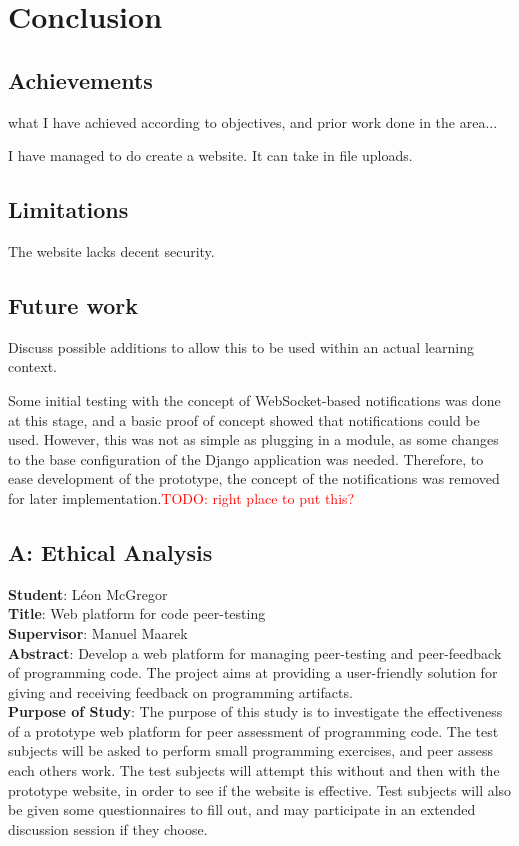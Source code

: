 \documentclass[a4paper,11pt]{report}
\newcommand{\todo}[1]{\textcolor{red}{TODO: #1}}
\begin{document}
\chapter{Conclusion}
\section{Achievements}
what I have achieved according to objectives, and prior work done in the area...\par
I have managed to do create a website. It can take in file uploads.
\section{Limitations}
The website lacks decent security.
\section{Future work}
Discuss possible additions to allow this to be used within an actual learning context.\par
Some initial testing with the concept of WebSocket-based notifications was done at this stage, and a basic proof of concept showed that notifications could be used. However, this was not as simple as plugging in a module, as some changes to the base configuration of the Django application was needed. Therefore, to ease development of the prototype, the concept of the notifications was removed for later implementation.\todo{right place to put this?}\par

\pagebreak
\singlespacing
\printbibliography
{}

\section*{A: Ethical Analysis}
\label{app:ethical}
\textbf{Student}: L\'eon McGregor\\
\textbf{Title}: Web platform for code peer-testing\\
\textbf{Supervisor}: Manuel Maarek\\
\textbf{Abstract}: Develop a web platform for managing peer-testing and peer-feedback of programming code. The project aims at providing a user-friendly solution for giving and receiving feedback on programming artifacts.\\
\textbf{Purpose of Study}: The purpose of this study is to investigate the effectiveness of a prototype web platform for peer assessment of programming code. The test subjects will be asked to perform small programming exercises, and peer assess each others work. The test subjects will attempt this without and then with the prototype website, in order to see if the website is effective. Test subjects will also be given some questionnaires to fill out, and may participate in an extended discussion session if they choose.
\end{document}
